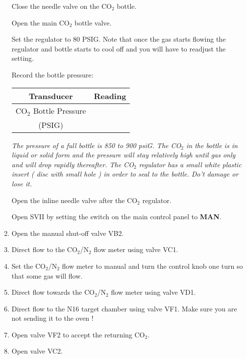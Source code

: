 \begin{enumerate}
\checkitem Close the needle valve on the CO$_2$ bottle. 

\checkitem Open the main CO$_2$ bottle valve.

\checkitem Set the regulator to 80 PSIG. Note that once the gas starts
 flowing the regulator and bottle starts to cool off and you will have 
to readjust the setting.

\checkitem  Record the bottle pressure:
  \begin{center}
  \begin{tabular}{|c|c|}
  \hline
  Transducer & Reading\\
  \hline
    CO$_2$ Bottle Pressure & \\
  (PSIG) & \\
  \hline 
  \end{tabular}
  \end{center}
  {\em The pressure of a full bottle is 850 to 900 psiG. The CO$_2$ in
  the bottle is in liquid or solid form and the pressure will stay
  relatively high until gas only and will drop rapidly thereafter.
  The CO$_2$ regulator has a small white plastic insert ( disc with small
hole ) in order to seal to the bottle. Do't damage or lose it.  }

\checkitem Open the inline needle valve after the CO$_2$ regulator.

\checkitem Open SVII by setting the switch on the main control panel
  to {\bf MAN}.

\item\checkbox Open the manual shut-off valve VB2.

\item\checkbox Direct flow to the CO$_2$/N$_2$ flow meter using valve VC1.
  

\item\checkbox Set the CO$_2$/N$_2$ flow meter to manual and turn the
control knob one turn so that some gas will flow.

\item \checkbox Direct flow towards the CO$_2$/N$_2$ flow meter using valve VD1.

\item\checkbox Direct flow to the N16 target chamber using valve VF1. Make
 sure you are   not sending it to the oven !

\item\checkbox Open valve VF2 to accept the returning CO$_2$.

\item\checkbox Open valve VC2.


\end{enumerate}

